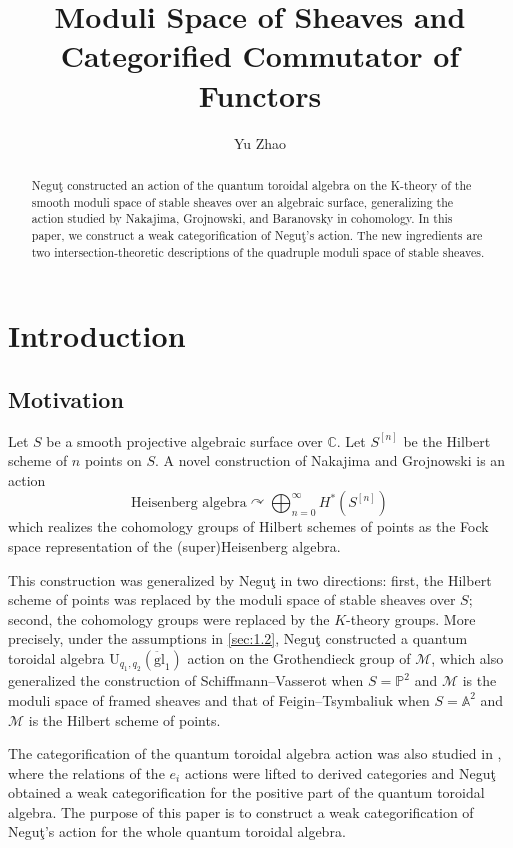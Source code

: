 \documentclass{amsart}
\title{Moduli Space of Sheaves and Categorified Commutator of Functors}
\author{Yu Zhao}
\numberwithin{equation}{section}
\newcommand\mc{\mathcal}
\newcommand\mb{\mathbb}
\theoremstyle{definition}
\theoremstyle{remark}
\begin{document}
\begin{abstract}
  Negu\c{t} constructed an action of the quantum toroidal algebra on the K-theory of the smooth moduli space of stable sheaves over an algebraic surface, generalizing the action studied by Nakajima, Grojnowski, and Baranovsky in cohomology. In this paper, we construct a weak categorification of Negu\c{t}'s action. The new ingredients are two intersection-theoretic descriptions of the quadruple moduli space of stable sheaves.
\end{abstract}
\maketitle


\section{Introduction}

\subsection{Motivation}  Let $S$ be a smooth projective algebraic surface over $\mb{C}$. Let $S^{[n]}$ be the Hilbert scheme of $n$ points on $S$. A novel construction of Nakajima \cite{nakajima1997} and Grojnowski \cite{grojnowski1996} is an action
\begin{equation}
\label{eqn:heis intro}
\text{Heisenberg algebra} \curvearrowright \bigoplus_{n=0}^{\infty} H^*(S^{[n]})
\end{equation}
which realizes the cohomology groups of Hilbert schemes of points as the Fock space representation of the (super)Heisenberg algebra. 

This construction was generalized by Negu\c{t} \cite{negut2017shuffle,neguct2018hecke} in two directions: first, the Hilbert scheme of points was replaced by the moduli space of stable sheaves over $S$; second, the cohomology groups were replaced by the $K$-theory groups. More precisely, under the assumptions in \cref{sec:1.2}, Negu\c{t} constructed a quantum toroidal algebra $\mathrm{U}_{q_{1},q_{2}}(\ddot{\mathrm{gl}}_{1})$ action on the Grothendieck group of $\mc{M}$, which also generalized the construction of Schiffmann--Vasserot \cite{schiffmann2013,MR3150250} when $S=\mb{P}^{2}$ and $\mc{M}$ is the moduli space of framed sheaves and that of Feigin--Tsymbaliuk \cite{MR2854154} when $S=\mb{A}^{2}$ and $\mc{M}$ is the Hilbert scheme of points.

The categorification of the quantum toroidal algebra action was also studied in \cite{neguct2018hecke}, where the relations of the $e_{i}$ actions were lifted to derived categories and Negu\c{t} obtained a weak categorification for the positive part of the quantum toroidal algebra. The purpose of this paper is to construct a weak categorification of Negu\c{t}'s action for the whole quantum toroidal algebra.
\end{document}

